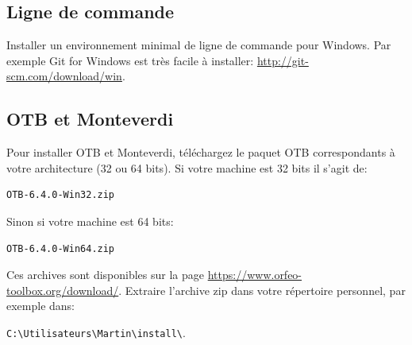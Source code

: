 \documentclass[10pt,a4paper]{article}
\begin{document}
\subsection{Ligne de commande}
Installer un environnement minimal de ligne de commande pour Windows. Par exemple
Git for Windows est très facile à installer:
\url{http://git-scm.com/download/win}.

\subsection{OTB et Monteverdi}
Pour installer OTB et Monteverdi, téléchargez le paquet OTB correspondants à
votre architecture (32 ou 64 bits). Si votre machine est 32
bits il s'agit de:

\begin{verbatim}
OTB-6.4.0-Win32.zip
\end{verbatim}

Sinon si votre machine est 64 bits:

\begin{verbatim}
OTB-6.4.0-Win64.zip
\end{verbatim}

Ces archives sont disponibles sur la page
\url{https://www.orfeo-toolbox.org/download/}.
Extraire l'archive zip dans votre répertoire personnel, par exemple dans:\\
\begin{centering}
\texttt{C:{\textbackslash}Utilisateurs{\textbackslash}Martin{\textbackslash}install{\textbackslash}}.
\end{centering}
\end{document}
